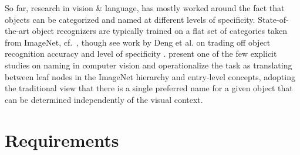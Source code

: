 \documentclass[runningheads]{llncs}
\begin{document}
So far, research in vision \& language, has mostly worked around the fact that objects can be categorized and named at different levels of specificity.
 State-of-the-art object recognizers are typically trained on a flat set of categories taken from ImageNet, cf.\ \cite{googlenet}, though see work by Deng et al. on trading off object recognition accuracy and level of specificity \cite{deng2012hedging}.
\cite{Ordonez:2016} present one of the few explicit studies on naming in computer vision and operationalize the task as translating between leaf nodes in the ImageNet hierarchy and entry-level
 concepts, adopting the traditional view that there is a single preferred name for a given object that can be determined independently of the visual context.

\section{Requirements}
\label{sec:requirements}
\end{document}
